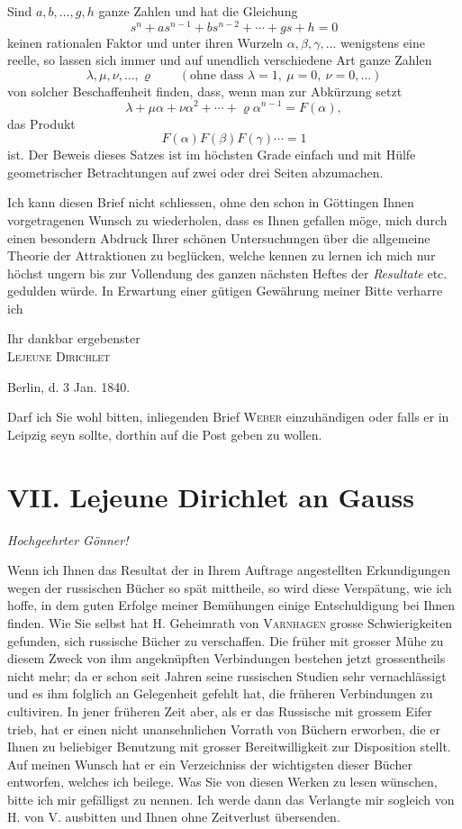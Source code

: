 \documentclass[11pt]{article}
\newcommand{\scn}[1]{\textsc{#1}}
\begin{document}
Sind $a,b,\ldots,g,h$ ganze Zahlen und hat die Gleichung
\[
 s^n+as^{n-1}+bs^{n-2}+\cdots+gs+h=0
\]
keinen rationalen Faktor und unter ihren Wurzeln $\alpha,\beta,\gamma,\ldots$ wenigstens eine reelle, so lassen sich immer und auf unendlich verschiedene Art ganze Zahlen
\[
 \lambda,\mu,\nu,\ldots,\varrho\qquad(\text{ohne dass }\lambda=1,\ \mu=0,\ \nu=0,\ldots)
\]
von solcher Beschaffenheit finden, dass, wenn man zur Abkürzung setzt
\[
 \lambda+\mu\alpha+\nu\alpha^2+\cdots+\varrho\alpha^{n-1}=F(\alpha),
\]
das Produkt
\[
 F(\alpha)F(\beta)F(\gamma)\cdots=1
\]
ist. Der Beweis dieses Satzes ist im höchsten Grade einfach und mit Hülfe geometrischer Betrachtungen auf zwei oder drei Seiten abzumachen.

Ich kann diesen Brief nicht schliessen, ohne den schon in Göttingen Ihnen vorgetragenen Wunsch zu wiederholen, dass es Ihnen gefallen möge, mich durch einen besondern Abdruck Ihrer schönen Untersuchungen über die allgemeine Theorie der Attraktionen zu beglücken, welche kennen zu lernen ich mich nur höchst ungern bis zur Vollendung des ganzen nächsten Heftes der \emph{Resultate} etc. gedulden würde. In Erwartung einer gütigen Gewährung meiner Bitte verharre ich

\begin{flushright}
Ihr dankbar ergebenster\\
\scn{Lejeune Dirichlet}
\end{flushright}
Berlin, d. 3 Jan. 1840.

Darf ich Sie wohl bitten, inliegenden Brief \scn{Weber} einzuhändigen oder falls er in Leipzig seyn sollte, dorthin auf die Post geben zu wollen.

\section*{VII. Lejeune Dirichlet an Gauss}
\begin{center}\emph{Hochgeehrter Gönner!}\end{center}

Wenn ich Ihnen das Resultat der in Ihrem Auftrage angestellten Erkundigungen wegen der russischen Bücher so spät mittheile, so wird diese Verspätung, wie ich hoffe, in dem guten Erfolge meiner Bemühungen einige Entschuldigung bei Ihnen finden. Wie Sie selbst hat H. Geheimrath von \scn{Varnhagen} grosse Schwierigkeiten gefunden, sich russische Bücher zu verschaffen. Die früher mit grosser Mühe zu diesem Zweck von ihm angeknüpften Verbindungen bestehen jetzt grossentheils nicht mehr; da er schon seit Jahren seine russischen Studien sehr vernachlässigt und es ihm folglich an Gelegenheit gefehlt hat, die früheren Verbindungen zu cultiviren. In jener früheren Zeit aber, als er das Russische mit grossem Eifer trieb, hat er einen nicht unansehnlichen Vorrath von Büchern erworben, die er Ihnen zu beliebiger Benutzung mit grosser Bereitwilligkeit zur Disposition stellt. Auf meinen Wunsch hat er ein Verzeichniss der wichtigsten dieser Bücher entworfen, welches ich beilege. Was Sie von diesen Werken zu lesen wünschen, bitte ich mir gefälligst zu nennen. Ich werde dann das Verlangte mir sogleich von H. von V. ausbitten und Ihnen ohne Zeitverlust übersenden.
\end{document}
